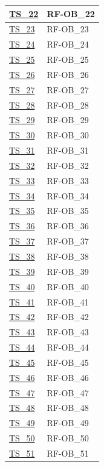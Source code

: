 \begin{longtable}{|
		>{\raggedright\arraybackslash}p{} |
		>{\centering\arraybackslash}p{} |
	}
	\hyperlink{ts-22}{TS\_22} & RF-OB\_22 \\ \hline
	\hyperlink{ts-23}{TS\_23} & RF-OB\_23 \\ \hline
	\hyperlink{ts-24}{TS\_24} & RF-OB\_24 \\ \hline
	\hyperlink{ts-25}{TS\_25} & RF-OB\_25 \\ \hline
	\hyperlink{ts-26}{TS\_26} & RF-OB\_26 \\ \hline
	\hyperlink{ts-27}{TS\_27} & RF-OB\_27 \\ \hline
	\hyperlink{ts-28}{TS\_28} & RF-OB\_28 \\ \hline
	\hyperlink{ts-29}{TS\_29} & RF-OB\_29 \\ \hline
	\hyperlink{ts-30}{TS\_30} & RF-OB\_30 \\ \hline
	\hyperlink{ts-31}{TS\_31} & RF-OB\_31 \\ \hline
	\hyperlink{ts-32}{TS\_32} & RF-OB\_32 \\ \hline
	\hyperlink{ts-33}{TS\_33} & RF-OB\_33 \\ \hline
	\hyperlink{ts-34}{TS\_34} & RF-OB\_34 \\ \hline
	\hyperlink{ts-35}{TS\_35} & RF-OB\_35 \\ \hline
	\hyperlink{ts-36}{TS\_36} & RF-OB\_36 \\ \hline
	\hyperlink{ts-37}{TS\_37} & RF-OB\_37 \\ \hline
	\hyperlink{ts-38}{TS\_38} & RF-OB\_38 \\ \hline
	\hyperlink{ts-39}{TS\_39} & RF-OB\_39 \\ \hline
	\hyperlink{ts-40}{TS\_40} & RF-OB\_40 \\ \hline
	\hyperlink{ts-41}{TS\_41} & RF-OB\_41 \\ \hline
	\hyperlink{ts-42}{TS\_42} & RF-OB\_42 \\ \hline
	\hyperlink{ts-43}{TS\_43} & RF-OB\_43 \\ \hline
	\hyperlink{ts-44}{TS\_44} & RF-OB\_44 \\ \hline
	\hyperlink{ts-45}{TS\_45} & RF-OB\_45 \\ \hline
	\hyperlink{ts-46}{TS\_46} & RF-OB\_46 \\ \hline
	\hyperlink{ts-47}{TS\_47} & RF-OB\_47 \\ \hline
	\hyperlink{ts-48}{TS\_48} & RF-OB\_48 \\ \hline
	\hyperlink{ts-49}{TS\_49} & RF-OB\_49 \\ \hline
	\hyperlink{ts-50}{TS\_50} & RF-OB\_50 \\ \hline
	\hyperlink{ts-51}{TS\_51} & RF-OB\_51 \\ \hline

\end{longtable}
